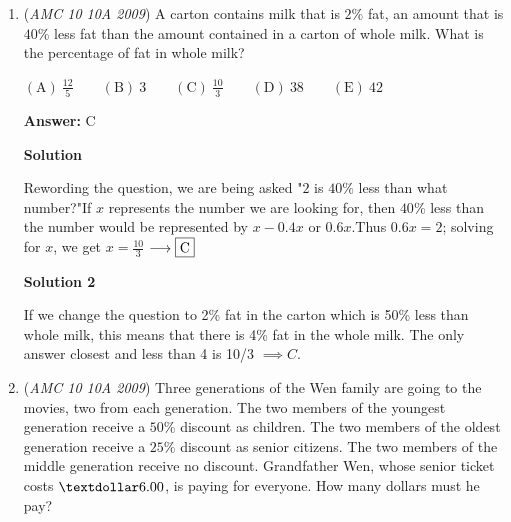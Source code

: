 \begin{enumerate}
\textbf{Solution}

The solution above is the standard method of solving it, but we can also realize something about their radii. If we see, we know that the smaller circle has a radius of $2$ while the larger semicircle has a radius of $4$. We know for a fact that if we have $2$ normal full circles and one has a radius that is double the other, the smaller circle will always be $4$ times smaller than the larger one (if you didn't know, now you know). Now, we have a semicircle, so the same thing applies but the larger circle is cut in half, so therefore, the semicircle (which has the bigger radius), will be double the size of the small circle that is inscribed in it. Double means that $2$ of the small full circles will be able to fit the larger semi-circle. So, therefore, the area that is shaded is equal to the area of the small full circle, making $2$ equal parts, so the shaded area is $\frac{1}{2}$ of the whole semi-circle

 $\frac{1}{2}\Longrightarrow \fbox{A}$



	\item (\textit{AMC 10 10A 2009}) A carton contains milk that is $2$\% fat, an amount that is $40$\% less fat than the amount contained in a carton of whole milk. What is the percentage of fat in whole milk?


 $\mathrm{(A)}\ \frac{12}{5} \qquad \mathrm{(B)}\ 3 \qquad \mathrm{(C)}\ \frac{10}{3} \qquad \mathrm{(D)}\ 38 \qquad \mathrm{(E)}\ 42$

 \textbf{Answer: }C



\textbf{Solution}

Rewording the question, we are being asked "$2$ is $40\%$ less than what number?"If $x$ represents the number we are looking for, then $40\%$ less than the number would be represented by $x-0.4x$ or $0.6x$.Thus $0.6x=2$; solving for $x$, we get $x=\frac{10}{3}$ $\longrightarrow \fbox{C}$




\textbf{Solution 2}

If we change the question to 2\% fat in the carton which is 50\% less than whole milk, this means that there is 4\% fat in the whole milk. The only answer closest and less than 4 is 10/3 $\implies \boxed{C}$.

 


	\item (\textit{AMC 10 10A 2009}) Three generations of the Wen family are going to the movies, two from each generation. The two members of the youngest generation receive a $50$\% discount as children. The two members of the oldest generation receive a $25\%$ discount as senior citizens. The two members of the middle generation receive no discount. Grandfather Wen, whose senior ticket costs $\textdollar 6.00$, is paying for everyone. How many dollars must he pay?



\end{enumerate}
